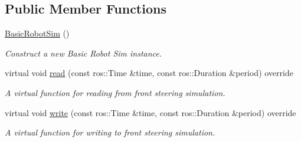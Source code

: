 \subsection*{Public Member Functions}
\begin{DoxyCompactItemize}
\item 
\mbox{\label{classBasicRobotSim_a8609903f149d0af379695b3c61fc1b9c}} 
\hyperlink{classBasicRobotSim_a8609903f149d0af379695b3c61fc1b9c}{Basic\+Robot\+Sim} ()
\begin{DoxyCompactList}\small\item\em Construct a new Basic Robot Sim instance. \end{DoxyCompactList}\item 
virtual void \hyperlink{classBasicRobotSim_a8e6a778a8f79818f01dcf0211a3b8e3f}{read} (const ros\+::\+Time \&time, const ros\+::\+Duration \&period) override
\begin{DoxyCompactList}\small\item\em A virtual function for reading from front steering simulation. \end{DoxyCompactList}\item 
virtual void \hyperlink{classBasicRobotSim_aa05ea705c931dacabb1e47d9ebab3174}{write} (const ros\+::\+Time \&time, const ros\+::\+Duration \&period) override
\begin{DoxyCompactList}\small\item\em A virtual function for writing to front steering simulation. \end{DoxyCompactList}\end{DoxyCompactItemize}
